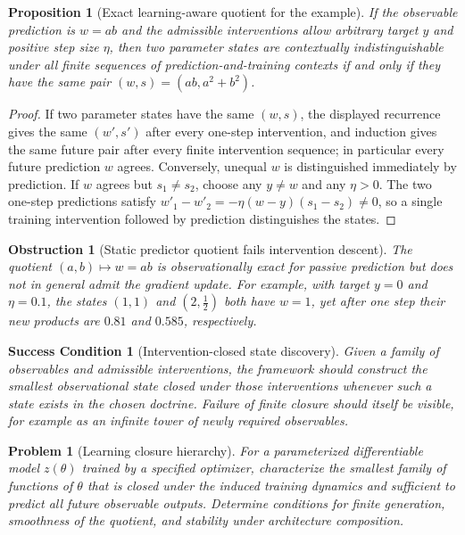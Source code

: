 \documentclass[11pt]{article}
\newtheorem{proposition}[theorem]{Proposition}
\newtheorem{condition}[theorem]{Success Condition}
\newtheorem{problem}[theorem]{Problem}
\newtheorem{obstruction}[theorem]{Obstruction}
\theoremstyle{definition}
\theoremstyle{remark}
\begin{document}
\begin{proposition}[Exact learning-aware quotient for the example]
If the observable prediction is $w=ab$ and the admissible interventions allow arbitrary target $y$ and positive step size $\eta$, then two parameter states are contextually indistinguishable under all finite sequences of prediction-and-training contexts if and only if they have the same pair $(w,s)=(ab,a^2+b^2)$.
\end{proposition}

\begin{proof}
If two parameter states have the same $(w,s)$, the displayed recurrence gives the same $(w',s')$ after every one-step intervention, and induction gives the same future pair after every finite intervention sequence; in particular every future prediction $w$ agrees. Conversely, unequal $w$ is distinguished immediately by prediction. If $w$ agrees but $s_1\neq s_2$, choose any $y\neq w$ and any $\eta>0$. The two one-step predictions satisfy $w'_1-w'_2=-\eta(w-y)(s_1-s_2)\neq0$, so a single training intervention followed by prediction distinguishes the states.
\end{proof}

\begin{obstruction}[Static predictor quotient fails intervention descent]
The quotient $(a,b)\mapsto w=ab$ is observationally exact for passive prediction but does not in general admit the gradient update. For example, with target $y=0$ and $\eta=0.1$, the states $(1,1)$ and $(2,\tfrac12)$ both have $w=1$, yet after one step their new products are $0.81$ and $0.585$, respectively.
\end{obstruction}

\begin{condition}[Intervention-closed state discovery]
Given a family of observables and admissible interventions, the framework should construct the smallest observational state closed under those interventions whenever such a state exists in the chosen doctrine. Failure of finite closure should itself be visible, for example as an infinite tower of newly required observables.
\end{condition}

\begin{problem}[Learning closure hierarchy]
For a parameterized differentiable model $z(\theta)$ trained by a specified optimizer, characterize the smallest family of functions of $\theta$ that is closed under the induced training dynamics and sufficient to predict all future observable outputs. Determine conditions for finite generation, smoothness of the quotient, and stability under architecture composition.
\end{problem}
\end{document}
